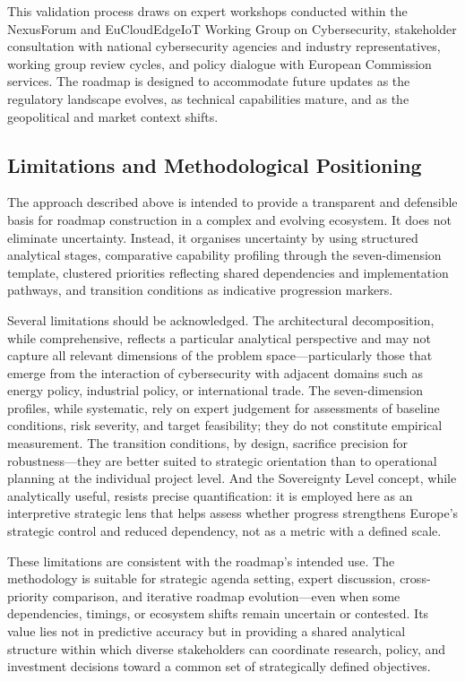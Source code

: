 This validation process draws on expert workshops conducted within the NexusForum and EuCloudEdgeIoT Working Group on Cybersecurity, stakeholder consultation with national cybersecurity agencies and industry representatives, working group review cycles, and policy dialogue with European Commission services. The roadmap is designed to accommodate future updates as the regulatory landscape evolves, as technical capabilities mature, and as the geopolitical and market context shifts.


\subsection{Limitations and Methodological Positioning}
\label{sec:meth-limitations}

The approach described above is intended to provide a transparent and defensible basis for roadmap construction in a complex and evolving ecosystem. It does not eliminate uncertainty. Instead, it organises uncertainty by using structured analytical stages, comparative capability profiling through the seven-dimension template, clustered priorities reflecting shared dependencies and implementation pathways, and transition conditions as indicative progression markers.

Several limitations should be acknowledged. The architectural decomposition, while comprehensive, reflects a particular analytical perspective and may not capture all relevant dimensions of the problem space---particularly those that emerge from the interaction of cybersecurity with adjacent domains such as energy policy, industrial policy, or international trade. The seven-dimension profiles, while systematic, rely on expert judgement for assessments of baseline conditions, risk severity, and target feasibility; they do not constitute empirical measurement. The transition conditions, by design, sacrifice precision for robustness---they are better suited to strategic orientation than to operational planning at the individual project level. And the Sovereignty Level concept, while analytically useful, resists precise quantification: it is employed here as an interpretive strategic lens that helps assess whether progress strengthens Europe's strategic control and reduced dependency, not as a metric with a defined scale.

These limitations are consistent with the roadmap's intended use. The methodology is suitable for strategic agenda setting, expert discussion, cross-priority comparison, and iterative roadmap evolution---even when some dependencies, timings, or ecosystem shifts remain uncertain or contested. Its value lies not in predictive accuracy but in providing a shared analytical structure within which diverse stakeholders can coordinate research, policy, and investment decisions toward a common set of strategically defined objectives.



